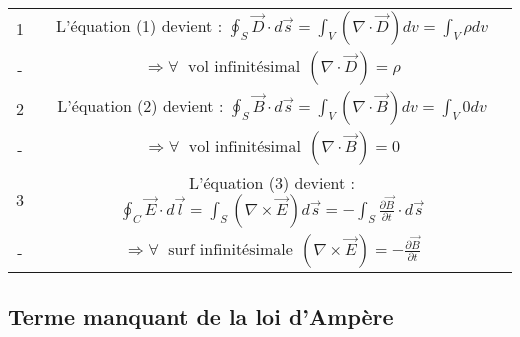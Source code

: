 \begin{center}

\begin{tabular}{|c|c|}

\hline

1 & L'équation (1) devient : $ \oint_{S} \vec{D} \cdot d\vec{s}  =  \int_{V} (\nabla \cdot \vec{D} ) dv =  \int_{V} \rho dv$ \\  
- & $\Rightarrow \forall  \hspace{3pt} \mbox{ vol infinitésimal} \hspace{5pt} (\nabla \cdot \vec{D} ) = \rho$  \\

\hline

2 & L'équation (2) devient : $ \oint_{S} \vec{B} \cdot d\vec{s}  =  \int_{V} (\nabla \cdot \vec{B} ) dv =  \int_{V} 0 dv$ \\ 
- & $\Rightarrow \forall  \hspace{3pt} \mbox{ vol infinitésimal} \hspace{5pt} (\nabla \cdot \vec{B} ) = 0 $ \\

\hline

3 & L'équation (3) devient : $   \oint_{C} \vec{E} \cdot d\vec{l} = \int_{S} (\nabla \times \vec{E}) d\vec{s}= -\int_{S} \frac{\partial \vec{B}}{\partial t} \cdot d\vec{s}$ \\  
- &$ \Rightarrow \forall  \hspace{3pt} \mbox{ surf infinitésimale} \hspace{5pt} (\nabla \times \vec{E} ) = -\frac{\partial \vec{B}}{\partial t}$\\

\hline

\end{tabular}

\end{center}

\subsection{Terme manquant de la loi d'Ampère}

